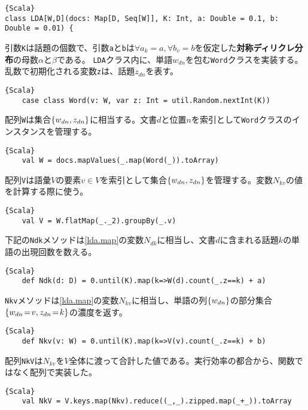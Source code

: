 \documentclass[10pt,a4paper]{book}
\begin{document}
\begin{Verbatim}{Scala}
class LDA[W,D](docs: Map[D, Seq[W]], K: Int, a: Double = 0.1, b: Double = 0.01) {
\end{Verbatim}

引数\texttt{K}は話題の個数で、引数\texttt{a}と\texttt{b}は$\forall a_k\!=\!a,\forall b_v\!=\!b$を仮定した\textbf{対称ディリクレ分布}の母数$\alpha$と$\beta$である。
\texttt{LDA}クラス内に、単語$w_{dn}$を包む\texttt{Word}クラスを実装する。乱数で初期化される変数\texttt{z}は、話題$z_{dn}$を表す。

\begin{Verbatim}{Scala}
	case class Word(v: W, var z: Int = util.Random.nextInt(K))
\end{Verbatim}

配列\texttt{W}は集合$\seq{w_{dn},z_{dn}}$に相当する。文書$d$と位置$n$を索引として\texttt{Word}クラスのインスタンスを管理する。

\begin{Verbatim}{Scala}
	val W = docs.mapValues(_.map(Word(_)).toArray)
\end{Verbatim}

配列\texttt{V}は語彙$V$の要素$v\!\in\!V$を索引として集合$\seq{w_{dn},z_{dn}}$を管理する。変数$N_{kv}$の値を計算する際に使う。

\begin{Verbatim}{Scala}
	val V = W.flatMap(_._2).groupBy(_.v)
\end{Verbatim}

下記の\texttt{Ndk}メソッドは\eqref{lda.map}の変数$N_{dk}$に相当し、文書$d$に含まれる話題$k$の単語の出現回数を数える。

\begin{Verbatim}{Scala}
	def Ndk(d: D) = 0.until(K).map(k=>W(d).count(_.z==k) + a)
\end{Verbatim}

\texttt{Nkv}メソッドは\eqref{lda.map}の変数$N_{kv}$に相当し、単語の列$\seq{w_{dn}}$の部分集合$\seq{w_{dn}\!=\!v,z_{dn}\!=\!k}$の濃度を返す。

\begin{Verbatim}{Scala}
	def Nkv(v: W) = 0.until(K).map(k=>V(v).count(_.z==k) + b)
\end{Verbatim}

配列\texttt{NkV}は$N_{kv}$を$V$全体に渡って合計した値である。実行効率の都合から、関数ではなく配列で実装した。

\begin{Verbatim}{Scala}
	val NkV = V.keys.map(Nkv).reduce((_,_).zipped.map(_+_)).toArray
\end{Verbatim}
\end{document}

